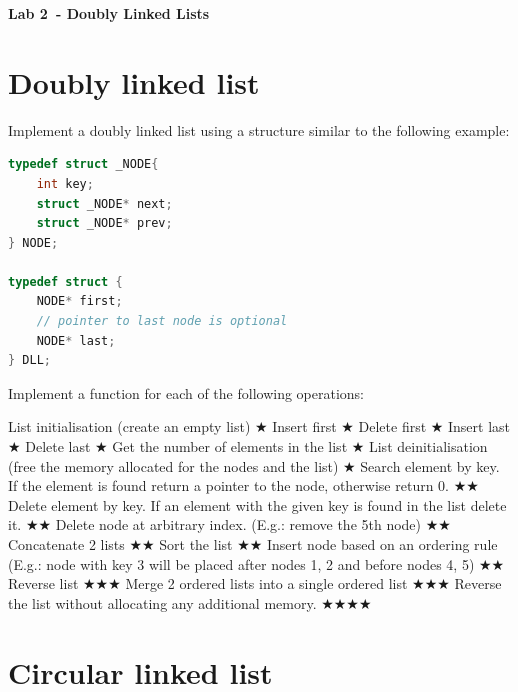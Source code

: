 \documentclass{exam}
\newcommand\labnr{2}
\newcommand\lab{Lab \labnr\ - Doubly Linked Lists}
\newcommand\lvlez{$\bigstar$}
\newcommand\lvlmed{\lvlez\lvlez}
\newcommand\lvlhard{\lvlmed\lvlez}
\newcommand\lvlvhard{\lvlhard\lvlez}
\begin{document}
\begin{center}
    \vspace*{0cm}
    \bfseries\LARGE
    \lab
    \vspace*{1cm}
\end{center}

\section{Doubly linked list}

\noindent Implement a doubly linked list using a structure similar to the following example:

\begin{lstlisting}[language=C]
typedef struct _NODE{
    int key;
    struct _NODE* next;
    struct _NODE* prev;
} NODE;

typedef struct {
    NODE* first;
    // pointer to last node is optional
    NODE* last;
} DLL;
\end{lstlisting}


\bigskip
\noindent Implement a function for each of the following operations:

\begin{questions}
\question List initialisation (create an empty list) \lvlez
\question Insert first \lvlez
\question Delete first \lvlez
\question Insert last \lvlez
\question Delete last \lvlez
\question Get the number of elements in the list \lvlez
\question List deinitialisation (free the memory allocated for the nodes and the list) \lvlez
\question Search element by key. If the element is found return a pointer to the node, otherwise return 0. \lvlmed
\question Delete element by key. If an element with the given key is found in the list delete it. \lvlmed
\question Delete node at arbitrary index. (E.g.: remove the 5th node) \lvlmed
\question Concatenate 2 lists \lvlmed
\question Sort the list \lvlmed
\question Insert node based on an ordering rule (E.g.: node with key 3 will be placed after nodes 1, 2 and before nodes 4, 5) \lvlmed
\question Reverse list \lvlhard
\question Merge 2 ordered lists into a single ordered list \lvlhard
\question Reverse the list without allocating any additional memory. \lvlvhard
\end{questions}

\section{Circular linked list}
\end{document}
